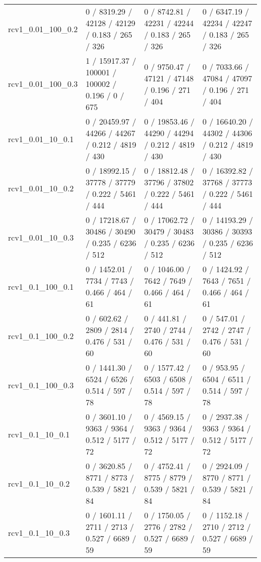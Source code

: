 \begin{tabular}{llll}
         rcv1\_0.01\_100\_0.2 &   0 / 8319.29 /  42128 /   42129 / 0.183 /    265 /    326 &   0 / 8742.81 /  42231 /   42244 / 0.183 /    265 /    326 &   0 / 6347.19 /  42234 /   42247 / 0.183 /    265 /    326 \\
         rcv1\_0.01\_100\_0.3 &  1 / 15917.37 / 100001 /  100002 / 0.196 /      0 /    675 &   0 / 9750.47 /  47121 /   47148 / 0.196 /    271 /    404 &   0 / 7033.66 /  47084 /   47097 / 0.196 /    271 /    404 \\
          rcv1\_0.01\_10\_0.1 &  0 / 20459.97 /  44266 /   44267 / 0.212 /   4819 /    430 &  0 / 19853.46 /  44290 /   44294 / 0.212 /   4819 /    430 &  0 / 16640.20 /  44302 /   44306 / 0.212 /   4819 /    430 \\
          rcv1\_0.01\_10\_0.2 &  0 / 18992.15 /  37778 /   37779 / 0.222 /   5461 /    444 &  0 / 18812.48 /  37796 /   37802 / 0.222 /   5461 /    444 &  0 / 16392.82 /  37768 /   37773 / 0.222 /   5461 /    444 \\
          rcv1\_0.01\_10\_0.3 &  0 / 17218.67 /  30486 /   30490 / 0.235 /   6236 /    512 &  0 / 17062.72 /  30479 /   30483 / 0.235 /   6236 /    512 &  0 / 14193.29 /  30386 /   30393 / 0.235 /   6236 /    512 \\
          rcv1\_0.1\_100\_0.1 &   0 / 1452.01 /   7734 /    7743 / 0.466 /    464 /     61 &   0 / 1046.00 /   7642 /    7649 / 0.466 /    464 /     61 &   0 / 1424.92 /   7643 /    7651 / 0.466 /    464 /     61 \\
          rcv1\_0.1\_100\_0.2 &    0 / 602.62 /   2809 /    2814 / 0.476 /    531 /     60 &    0 / 441.81 /   2740 /    2744 / 0.476 /    531 /     60 &    0 / 547.01 /   2742 /    2747 / 0.476 /    531 /     60 \\
          rcv1\_0.1\_100\_0.3 &   0 / 1441.30 /   6524 /    6526 / 0.514 /    597 /     78 &   0 / 1577.42 /   6503 /    6508 / 0.514 /    597 /     78 &    0 / 953.95 /   6504 /    6511 / 0.514 /    597 /     78 \\
           rcv1\_0.1\_10\_0.1 &   0 / 3601.10 /   9363 /    9364 / 0.512 /   5177 /     72 &   0 / 4569.15 /   9363 /    9364 / 0.512 /   5177 /     72 &   0 / 2937.38 /   9363 /    9364 / 0.512 /   5177 /     72 \\
           rcv1\_0.1\_10\_0.2 &   0 / 3620.85 /   8771 /    8773 / 0.539 /   5821 /     84 &   0 / 4752.41 /   8775 /    8779 / 0.539 /   5821 /     84 &   0 / 2924.09 /   8770 /    8771 / 0.539 /   5821 /     84 \\
           rcv1\_0.1\_10\_0.3 &   0 / 1601.11 /   2711 /    2713 / 0.527 /   6689 /     59 &   0 / 1750.05 /   2776 /    2782 / 0.527 /   6689 /     59 &   0 / 1152.18 /   2710 /    2712 / 0.527 /   6689 /     59 \\

\end{tabular}
